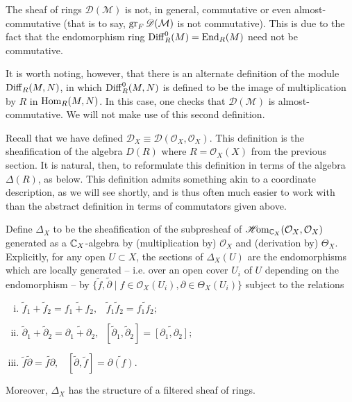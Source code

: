 \begin{remark}
    The sheaf of rings $\mathscr{D}(\mathcal{M})$ is not, in general, commutative or even
    almost-commutative (that is to say, $\operatorname{gr}_F \mathscr{D}(\mathcal{M})$ is not commutative).
    This is due to the fact that the endomorphism ring $\operatorname{Diff}_R^0(M)=\operatorname{End}_R(M)$ need not be
    commutative.

    It is worth noting, however, that there is an alternate definition of the module
    $\operatorname{Diff}_R(M,N)$, in which $\operatorname{Diff}^0_R(M,N)$ is defined to be the image of multiplication
    by $R$ in $\operatorname{Hom}_R(M,N)$. In this case, one checks that $\mathscr{D}(\mathcal{M})$ is
    almost-commutative. We will not make use of this second definition.
\end{remark}

Recall that we have defined $\mathscr{D}_X\equiv\mathscr{D}(\mathcal{O}_X,\mathcal{O}_X)$.
This definition is the sheafification of the algebra $D(R)$ where $R=\mathcal{O}_X(X)$ from
the previous section. It is natural, then, to reformulate this definition in terms of the
algebra $\Delta(R)$, as below. This definition admits something akin to a coordinate description,
as we will see shortly, and is thus often much easier to work with than the abstract definition
in terms of commutators given above.

\begin{definition}
    Define $\Delta_X$ to be the sheafification of the subpresheaf of $\operatorname{\mathscr{H}\!om}_{\mathbb{C}_X}(\mathcal{O}_X,\mathcal{O}_X)$
    generated as a $\mathbb{C}_X$-algebra by (multiplication by) $\mathcal{O}_X$ and (derivation by)
    $\Theta_X$. Explicitly, for any open $U\subset X$, the sections of $\Delta_X(U)$ are
    the endomorphisms which are locally generated -- i.e. over an open cover $U_i$ of $U$ depending
    on the endomorphism -- by 
    $\{\tilde f,\tilde \partial\mid f\in\mathcal{O}_X(U_i),\partial\in\Theta_X(U_i)\}$
    subject to the relations
    \begin{enumerate}[(i)]
        \item $\tilde f_1+\tilde f_2=\widetilde{f_1+f_2}, \;\;\; \tilde f_1\tilde f_2=\widetilde{f_1f_2};$
        \item $\tilde \partial_1 +\tilde \partial_2=\widetilde{\partial_1+\partial_2}, \;\; [\tilde\partial_1,\tilde\partial_2]=\widetilde{[\partial_1,\partial_2]};$
        \item $\tilde f\tilde \partial=\widetilde{f\partial}, \;\;\; [\tilde\partial,\tilde f]=\widetilde{\partial(f)}$.
    \end{enumerate}
    Moreover, $\Delta_X$ has the structure of a filtered sheaf of rings.
    \label{def:D_X2}
\end{definition}

